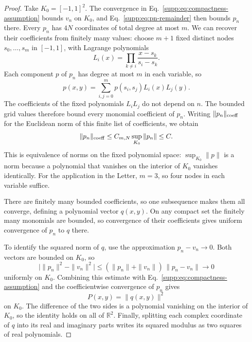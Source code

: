 \documentclass[aps,prl,onecolumn,10pt,superscriptaddress,nofootinbib,longbibliography]{revtex4-2}
\theoremstyle{remark}
\newcommand{\R}{\mathbb R}
\begin{document}
\begin{proof}
Take $K_0=[-1,1]^2$. The convergence in Eq.~\eqref{supp:eq:compactness-assumption} bounds $v_n$ on $K_0$, and Eq.~\eqref{supp:eq:pn-remainder} then bounds $p_n$ there. Every $p_n$ has $4N$ coordinates of total degree at most $m$. We can recover their coefficients from finitely many values: choose $m+1$ fixed distinct nodes $s_0,\ldots,s_m$ in $[-1,1]$, with Lagrange polynomials
\[
L_i(x)=\prod_{k\neq i}\frac{x-s_k}{s_i-s_k}.
\]
Each component $p$ of $p_n$ has degree at most $m$ in each variable, so
\[
p(x,y)=\sum_{i,j=0}^m p(s_i,s_j)L_i(x)L_j(y).
\]
The coefficients of the fixed polynomials $L_iL_j$ do not depend on $n$. The bounded grid values therefore bound every monomial coefficient of $p_n$. Writing $\|p_n\|_{\rm coeff}$ for the Euclidean norm of this finite list of coefficients, we obtain
\begin{equation}
\|p_n\|_{\rm coeff}
\leq C_{m,N}\sup_{K_0}\|p_n\|\leq C.
\label{supp:eq:rescaled-coefficient-bound}
\end{equation}
This is equivalence of norms on the fixed polynomial space: $\sup_{K_0}\|p\|$ is a norm because a polynomial that vanishes on the interior of $K_0$ vanishes identically. For the application in the Letter, $m=3$, so four nodes in each variable suffice.

There are finitely many bounded coefficients, so one subsequence makes them all converge, defining a polynomial vector $q(x,y)$. On any compact set the finitely many monomials are bounded, so convergence of their coefficients gives uniform convergence of $p_n$ to $q$ there.

To identify the squared norm of $q$, use the approximation $p_n-v_n\to0$. Both vectors are bounded on $K_0$, so
\begin{equation}
\bigl|\|p_n\|^2-\|v_n\|^2\bigr|
\leq(\|p_n\|+\|v_n\|)\,\|p_n-v_n\|
\longrightarrow0
\label{supp:eq:squared-norm-comparison}
\end{equation}
uniformly on $K_0$. Combining this estimate with Eq.~\eqref{supp:eq:compactness-assumption} and the coefficientwise convergence of $p_n$ gives
\begin{equation}
P(x,y)=\|q(x,y)\|^2
\label{supp:eq:P-norm-square}
\end{equation}
on $K_0$. The difference of the two sides is a polynomial vanishing on the interior of $K_0$, so the identity holds on all of $\R^2$. Finally, splitting each complex coordinate of $q$ into its real and imaginary parts writes its squared modulus as two squares of real polynomials.
\end{proof}
\end{document}
